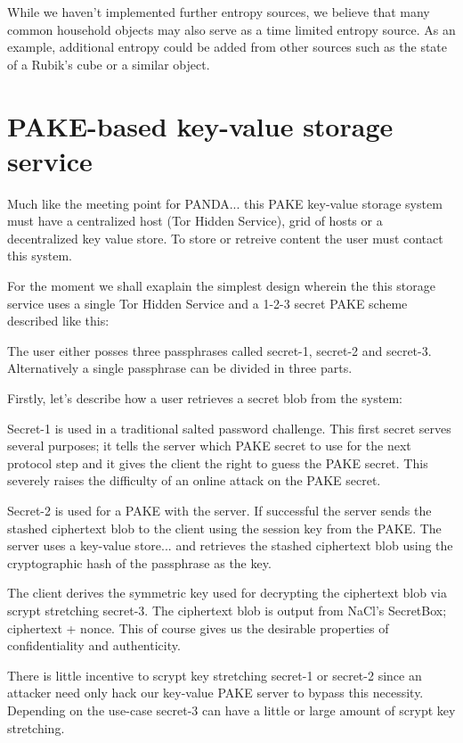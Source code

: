 \documentclass[letterpaper,twocolumn,10pt]{article}
\begin{document}
While we haven't implemented further entropy sources, we believe that many
common household objects may also serve as a time limited entropy source. As an
example, additional entropy could be added from other sources such as the state
of a Rubik's cube or a similar object.


\section{PAKE-based key-value storage service}

Much like the meeting point for PANDA... this PAKE key-value storage system
must have a centralized host (Tor Hidden Service), grid of hosts or a decentralized
key value store. To store or retreive content the user must contact this system.

For the moment we shall exaplain the simplest design wherein the this storage service
uses a single Tor Hidden Service and a 1-2-3 secret PAKE scheme described like this:

The user either posses three passphrases called secret-1, secret-2 and secret-3.
Alternatively a single passphrase can be divided in three parts.

Firstly, let's describe how a user retrieves a secret blob from the system:

Secret-1 is used in a traditional salted password challenge. This first secret serves several purposes;
it tells the server which PAKE secret to use for the next protocol step and it gives the client the right
to guess the PAKE secret. This severely raises the difficulty of an online attack on the PAKE secret.

Secret-2 is used for a PAKE with the server. If successful the server
sends the stashed ciphertext blob to the client using the session key
from the PAKE. The server uses a key-value store... and retrieves the
stashed ciphertext blob using the cryptographic hash of the passphrase
as the key.

The client derives the symmetric key used for decrypting the ciphertext blob via scrypt stretching secret-3.
The ciphertext blob is output from NaCl's SecretBox; ciphertext + nonce. This of course
gives us the desirable properties of confidentiality and authenticity.

There is little incentive to scrypt key stretching secret-1 or secret-2 since an attacker need only
hack our key-value PAKE server to bypass this necessity. Depending on the use-case secret-3
can have a little or large amount of scrypt key stretching.
\end{document}
